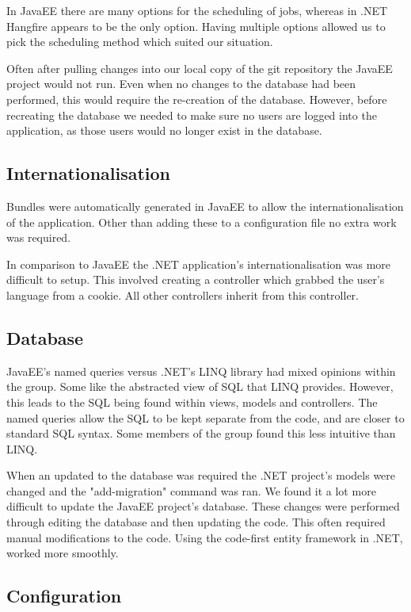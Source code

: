 In JavaEE there are many options for the scheduling of jobs, whereas in .NET Hangfire appears to be the only option. Having multiple options allowed us to pick the scheduling method which suited our situation.

Often after pulling changes into our local copy of the git repository the JavaEE project would not run. Even when no changes to the database had been performed, this would require the re-creation of the database. However, before recreating the database we needed to make sure no users are logged into the application, as those users would no longer exist in the database.

\subsection{Internationalisation}

Bundles were automatically generated in JavaEE to allow the internationalisation of the application. Other than adding these to a configuration file no extra work was required. 

In comparison to JavaEE the .NET application's internationalisation was more difficult to setup. This involved creating a controller which grabbed the user's language from a cookie. All other controllers inherit from this controller.

\subsection{Database}

JavaEE's named queries versus .NET's LINQ library had mixed opinions within the group. Some like the abstracted view of SQL that LINQ provides. However, this leads to the SQL being found within views, models and controllers. The named queries allow the SQL to be kept separate from the code, and are closer to standard SQL syntax. Some members of the group found this less intuitive than LINQ.

When an updated to the database was required the .NET project's models were changed and the "add-migration" command was ran. We found it a lot more difficult to update the JavaEE project's database. These changes were performed through editing the database and then updating the code. This often required manual modifications to the code. Using the code-first entity framework in .NET, worked more smoothly. 

\subsection{Configuration}

